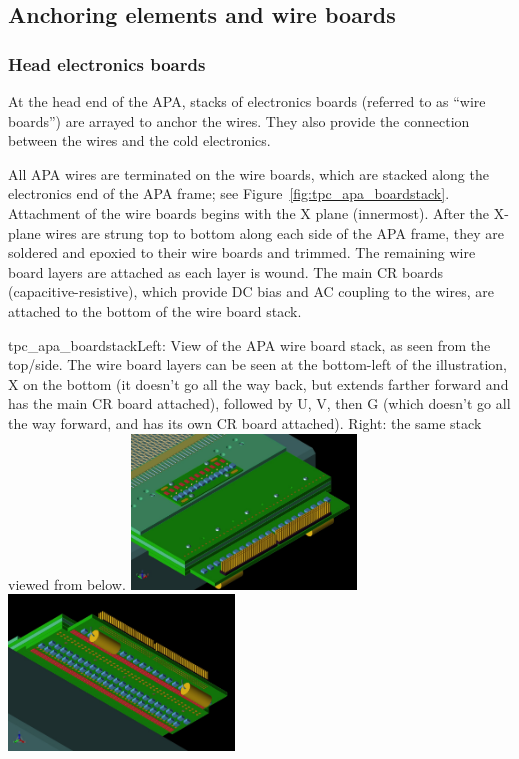 

\subsection{Anchoring elements and wire boards}
\label{subsubsec:apa_wire_anchor}


\subsubsection{Head electronics boards}

At the head end of the APA, stacks of electronics boards (referred to as ``wire boards'') are arrayed to anchor the wires.  They also provide the connection between the wires and the %
cold electronics.

All APA wires are terminated on the wire boards, which are stacked along the electronics end of the APA frame; see Figure~\ref{fig:tpc_apa_boardstack}. 
Attachment of the wire boards begins with the X plane (innermost). After the X-plane wires are strung top to bottom along each side of the APA frame, they are soldered and epoxied to their wire boards and trimmed. The remaining wire board layers are attached as each layer is wound.  The main CR boards (capacitive-resistive), which provide DC bias and AC coupling to the wires, are attached to the bottom of the wire board stack. %

\begin{cdrfigure}{tpc_apa_boardstack}{Left: View of the APA wire board stack, as seen from the top/side. The wire board layers can be seen at the bottom-left of the illustration, X on the bottom (it doesn't go all the way back, but extends farther forward and has the main CR board attached), followed by U, V, then G (which doesn't go all the way forward, and has its own CR board attached).  Right: the same stack viewed from below.  }
\includegraphics[width=0.45\textwidth]{figures/tpc_apa_boardstack_top.png}
\includegraphics[width=0.45\textwidth]{figures/tpc_apa_boardstack_bottom.png}
\end{cdrfigure}

